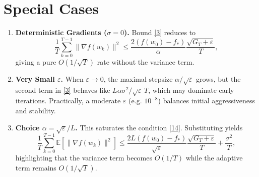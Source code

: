 \documentclass{article}
\newcommand{\E}{\mathbb{E}}
\begin{document}
\section*{Special Cases}
\begin{enumerate}[label=\arabic*.]
    \item \textbf{Deterministic Gradients ($\sigma=0$).}  
    Bound \eqref{3} reduces to
    \[
    \frac{1}{T}\sum_{k=0}^{T-1}\|\nabla f(w_k)\|^{2}
    \le
    \frac{2(f(w_0)-f_*)}{\alpha}\frac{\sqrt{G_T+\varepsilon}}{T},
    \]
    giving a pure $O(1/\sqrt{T})$ rate without the variance term.
    \item \textbf{Very Small $\varepsilon$.}  
    When $\varepsilon\to0$, the maximal stepsize $\alpha/\sqrt{\varepsilon}$ grows, but the second term in \eqref{3} behaves like $L\alpha\sigma^{2}/\sqrt{\varepsilon}\,T$, which may dominate early iterations. Practically, a moderate $\varepsilon$ (e.g. $10^{-8}$) balances initial aggressiveness and stability.
    \item \textbf{Choice $\alpha=\sqrt{\varepsilon}/L$.}  
    This saturates the condition \eqref{14}. Substituting yields
    \[
    \frac{1}{T}\sum_{k=0}^{T-1}\E[\|\nabla f(w_k)\|^{2}]
    \le
    \frac{2L(f(w_0)-f_*)}{\sqrt{\varepsilon}}\frac{\sqrt{G_T+\varepsilon}}{T}
    +\frac{\sigma^{2}}{T},
    \]
    highlighting that the variance term becomes $O(1/T)$ while the adaptive term remains $O(1/\sqrt{T})$.
\end{enumerate}
\end{document}

